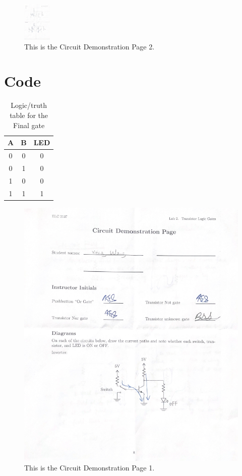 \documentclass[11pt]{article}
\begin{document}
	\begin{figure}[ht]\centering
		\includegraphics[width=0.12\textwidth]{Lab2Page2}
		\caption{This is the Circuit Demonstration Page 2.}
		\label{fig:original_logo}
	\end{figure}
	
	\section*{Code}
	
	\begin{table}[ht]\centering
		\caption{Logic/truth table for the Final gate}
		\label{tbl:example_table}
		\begin{tabular}{cc|c}
			\toprule
			A & B & LED \\
			\midrule
			0 & 0 & 0 \\
			0 & 1 & 0 \\
			1 & 0 & 0 \\
			1 & 1 & 1 \\
			\bottomrule
		\end{tabular}
	\end{table}
	
	\begin{figure}[ht]\centering
		\includegraphics[width=1\textwidth]{Lab2Page1}
		\caption{This is the Circuit Demonstration Page 1.}
		\label{fig:original_logo}
	\end{figure}
	
\end{document}

